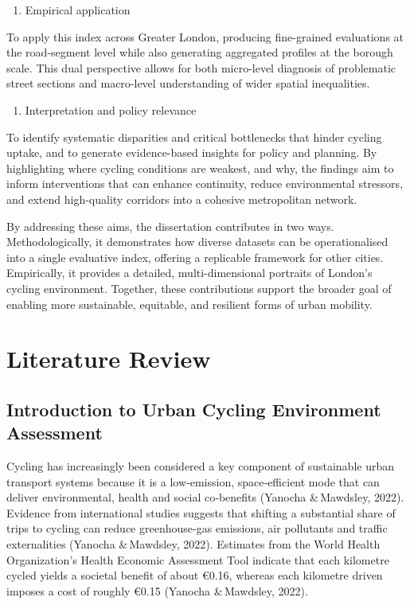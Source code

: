 \documentclass[
  12pt,
  oneside]{book}
\providecommand{\tightlist}{%
  \setlength{\itemsep}{0pt}\setlength{\parskip}{0pt}}
\begin{document}
\begin{enumerate}
\def\labelenumi{\arabic{enumi}.}
\setcounter{enumi}{1}
\tightlist
\item
  Empirical application
\end{enumerate}

To apply this index across Greater London, producing fine-grained evaluations at the road-segment level while also generating aggregated profiles at the borough scale. This dual perspective allows for both micro-level diagnosis of problematic street sections and macro-level understanding of wider spatial inequalities.

\begin{enumerate}
\def\labelenumi{\arabic{enumi}.}
\setcounter{enumi}{2}
\tightlist
\item
  Interpretation and policy relevance
\end{enumerate}

To identify systematic disparities and critical bottlenecks that hinder cycling uptake, and to generate evidence-based insights for policy and planning. By highlighting where cycling conditions are weakest, and why, the findings aim to inform interventions that can enhance continuity, reduce environmental stressors, and extend high-quality corridors into a cohesive metropolitan network.

By addressing these aims, the dissertation contributes in two ways. Methodologically, it demonstrates how diverse datasets can be operationalised into a single evaluative index, offering a replicable framework for other cities. Empirically, it provides a detailed, multi-dimensional portraits of London's cycling environment. Together, these contributions support the broader goal of enabling more sustainable, equitable, and resilient forms of urban mobility.

\chapter{Literature Review}\label{literature-review}

\section{Introduction to Urban Cycling Environment Assessment}\label{introduction-to-urban-cycling-environment-assessment}

Cycling has increasingly been considered a key component of sustainable urban transport systems because it is a low‑emission, space‑efficient mode that can deliver environmental, health and social co‑benefits (Yanocha \&\,Mawdsley, 2022). Evidence from international studies suggests that shifting a substantial share of trips to cycling can reduce greenhouse‑gas emissions, air pollutants and traffic externalities (Yanocha \&\,Mawdsley, 2022). Estimates from the World Health Organization's Health Economic Assessment Tool indicate that each kilometre cycled yields a societal benefit of about €0.16, whereas each kilometre driven imposes a cost of roughly €0.15 (Yanocha \&\,Mawdsley, 2022).
\end{document}
